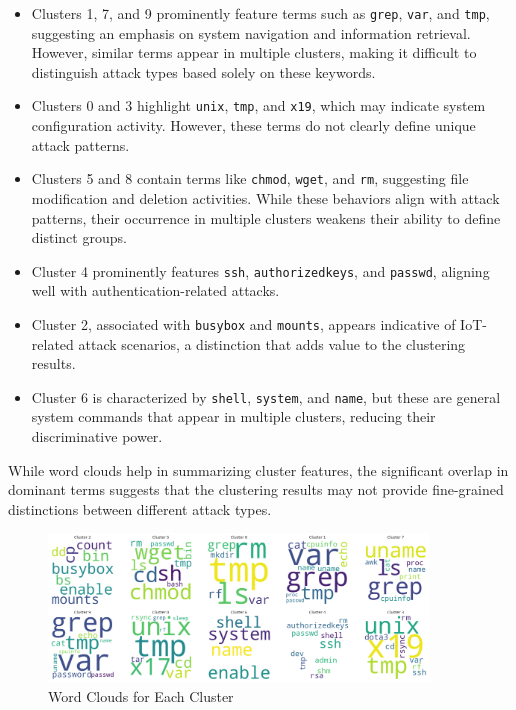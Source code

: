             \begin{itemize}
                \item Clusters 1, 7, and 9 prominently feature terms such as \texttt{grep}, \texttt{var}, and \texttt{tmp}, suggesting an emphasis on system navigation and information retrieval. However, similar terms appear in multiple clusters, making it difficult to distinguish attack types based solely on these keywords.
                \item Clusters 0 and 3 highlight \texttt{unix}, \texttt{tmp}, and \texttt{x19}, which may indicate system configuration activity. However, these terms do not clearly define unique attack patterns.
                \item Clusters 5 and 8 contain terms like \texttt{chmod}, \texttt{wget}, and \texttt{rm}, suggesting file modification and deletion activities. While these behaviors align with attack patterns, their occurrence in multiple clusters weakens their ability to define distinct groups.
                \item Cluster 4 prominently features \texttt{ssh}, \texttt{authorizedkeys}, and \texttt{passwd}, aligning well with authentication-related attacks.
                \item Cluster 2, associated with \texttt{busybox} and \texttt{mounts}, appears indicative of IoT-related attack scenarios, a distinction that adds value to the clustering results.
                \item Cluster 6 is characterized by \texttt{shell}, \texttt{system}, and \texttt{name}, but these are general system commands that appear in multiple clusters, reducing their discriminative power.
            \end{itemize}
            
            While word clouds help in summarizing cluster features, the significant overlap in dominant terms suggests that the clustering results may not provide fine-grained distinctions between different attack types.
            
            
            \begin{figure}[H]
                \centering
                \includegraphics[width=0.9\textwidth]{../figures/plots/section3/circular_wordclouds.png}
                \caption{Word Clouds for Each Cluster}
                \label{fig:word_clouds}
            \end{figure}
            
